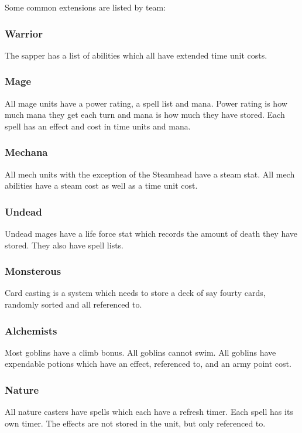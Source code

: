 \documentclass[a4paper]{article}
\begin{document}
Some common extensions are listed by team:

\subsubsection{Warrior}
The sapper has a list of abilities which all have extended time unit costs.

\subsubsection{Mage}
All mage units have a power rating, a spell list and mana. Power rating is how much mana they get each turn and mana is how much they have stored. Each spell has an effect and cost in time units and mana.

\subsubsection{Mechana}
All mech units with the exception of the Steamhead have a steam stat.
All mech abilities have a steam cost as well as a time unit cost.

\subsubsection{Undead}
Undead mages have a life force stat which records the amount of death they have stored. They also have spell lists.

\subsubsection{Monsterous}
Card casting is a system which needs to store a deck of say fourty cards, randomly sorted and all referenced to. 

\subsubsection{Alchemists}
Most goblins have a climb bonus.
All goblins cannot swim.
All goblins have expendable potions which have an effect, referenced to, and an army point cost.

\subsubsection{Nature}
All nature casters have spells which each have a refresh timer. Each spell has its own timer. The effects are not stored in the unit, but only referenced to.
\end{document}
